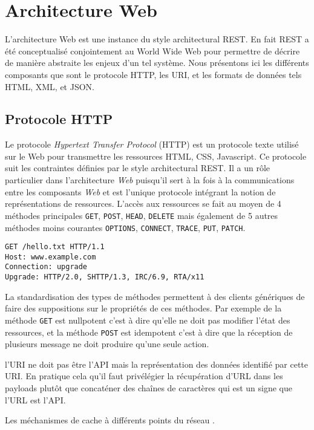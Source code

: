 \documentclass[a4paper, 11pt]{report}
\begin{document}
\section{Architecture Web}

L'architecture Web est une instance du style architectural REST.  En
fait REST a été conceptualisé conjointement au World Wide Web pour
permettre de décrire de manière abstraite les enjeux d'un tel système.
Nous présentons ici les différents composants que sont le protocole
HTTP, les URI, et les formats de données tels HTML, XML, et JSON.

\subsection{Protocole HTTP}

Le protocole \emph{Hypertext Transfer Protocol} (HTTP) est un
protocole texte utilisé sur le Web pour transmettre les ressources
HTML, CSS, Javascript.  Ce protocole suit les contraintes définies par
le style architectural REST.  Il a un rôle particulier dans
l'architecture \emph{Web} puisqu'il sert à la fois à la communications
entre les composants \emph{Web} et est l'unique protocole intégrant la
notion de représentations de ressources.  L'accès aux ressources se
fait au moyen de 4 méthodes principales \verb=GET=, \verb=POST=,
\verb=HEAD=, \verb=DELETE= mais également de 5 autres méthodes moins
courantes \verb=OPTIONS=, \verb=CONNECT=, \verb=TRACE=, \verb=PUT=,
\verb=PATCH=.

\begin{verbatim}
GET /hello.txt HTTP/1.1
Host: www.example.com
Connection: upgrade
Upgrade: HTTP/2.0, SHTTP/1.3, IRC/6.9, RTA/x11
\end{verbatim}

La standardisation des types de méthodes permettent à des clients
génériques de faire des suppositions sur le propriétés de ces
méthodes.  Par exemple de la méthode \verb=GET= est nullpotent c'est à
dire qu'elle ne doit pas modifier l'état des ressources, et la méthode
\verb=POST= est idempotent c'est à dire que la réception de plusieurs
message ne doit produire qu'une seule action.

l'URI ne doit pas être l'API mais la représentation des données
identifié par cette URI.  En pratique cela qu'il faut privélégier la
récupération d'URL dans les payloads plutôt que concaténer des chaînes
de caractères qui est un signe que l'URL est l'API.

Les méchanismes de cache à différents points du réseau
\cite{fielding1999hypertext}.
\end{document}
